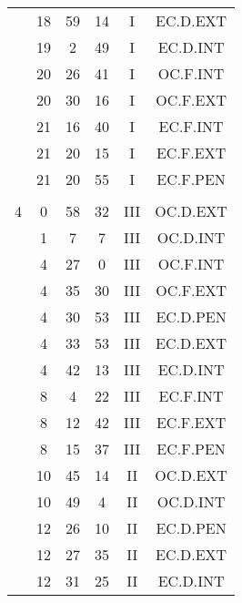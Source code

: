 \documentclass[12pt, a4paper]{article}
\begin{document}
\begin{multicols}{3}
{\begin{tabular}{c c c c c c}
	 	 	 	 & 18 & 59 & 14 & I & EC.D.EXT\\%
	 	 	 	 & 19 & 2 & 49 & I & EC.D.INT\\%
	 	 	 	 & 20 & 26 & 41 & I & OC.F.INT\\%
	 	 	 	 & 20 & 30 & 16 & I & OC.F.EXT\\%
	 	 	 	 & 21 & 16 & 40 & I & EC.F.INT\\%
	 	 	 	 & 21 & 20 & 15 & I & EC.F.EXT\\%
	 	 	 	 & 21 & 20 & 55 & I & EC.F.PEN\\%
	 	 	 	 & & & & & \\%
	 	 	 	4 & 0 & 58 & 32 & III & OC.D.EXT\\%
	 	 	 	 & 1 & 7 & 7 & III & OC.D.INT\\%
	 	 	 	 & 4 & 27 & 0 & III & OC.F.INT\\%
	 	 	 	 & 4 & 35 & 30 & III & OC.F.EXT\\%
	 	 	 	 & 4 & 30 & 53 & III & EC.D.PEN\\%
	 	 	 	 & 4 & 33 & 53 & III & EC.D.EXT\\%
	 	 	 	 & 4 & 42 & 13 & III & EC.D.INT\\%
	 	 	 	 & 8 & 4 & 22 & III & EC.F.INT\\%
	 	 	 	 & 8 & 12 & 42 & III & EC.F.EXT\\%
	 	 	 	 & 8 & 15 & 37 & III & EC.F.PEN\\%
	 	 	 	 & 10 & 45 & 14 & II & OC.D.EXT\\%
	 	 	 	 & 10 & 49 & 4 & II & OC.D.INT\\%
	 	 	 	 & 12 & 26 & 10 & II & EC.D.PEN\\%
	 	 	 	 & 12 & 27 & 35 & II & EC.D.EXT\\%
	 	 	 	 & 12 & 31 & 25 & II & EC.D.INT\\%

\end{tabular}}
\end{multicols}
\end{document}

